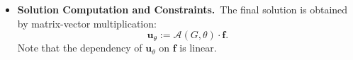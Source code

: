 \documentclass{article}
\newcommand{\R}{\mathbb{R}}
\newcommand{\Dlat}{d_v} %
\theoremstyle{plain}
\numberwithin{equation}{section}
\begin{document}
\begin{itemize}
          The operator matrix $\mathcal{A}(G, \theta)$ is computed as:
          \begin{equation}
              \mathcal{A}(G, \theta) := \frac{Q \cdot K^\top}{\sqrt{\Dlat}},
              \label{eq:operator_matrix}
          \end{equation}
          therefore, the output of the processed geometry $G$ is the matrix $\mathcal{A}(G, \theta)\in \R^{n\times n}$.

    \item \textbf{Solution Computation and Constraints.}\
          The final solution is obtained by matrix-vector multiplication:
          \begin{equation*}
              \mathbf{u}_\theta := \mathcal{A}(G, \theta) \cdot \mathbf{f}.
          \end{equation*}
          Note that the dependency of $\mathbf{u}_\theta$ on $\mathbf{f}$ is linear.
\end{itemize}
\end{document}
